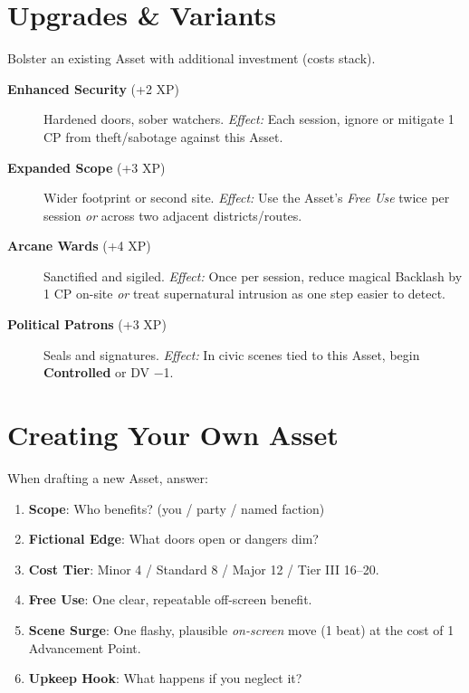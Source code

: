 \section{Upgrades \& Variants}
Bolster an existing Asset with additional investment (costs stack).
\begin{description}
  \item[\textbf{Enhanced Security} (+2 XP)]  Hardened doors, sober watchers. \emph{Effect:} Each session, ignore or mitigate 1 CP from theft/sabotage against this Asset.
  \item[\textbf{Expanded Scope} (+3 XP)]  Wider footprint or second site. \emph{Effect:} Use the Asset’s \emph{Free Use} twice per session \emph{or} across two adjacent districts/routes.
  \item[\textbf{Arcane Wards} (+4 XP)]  Sanctified and sigiled. \emph{Effect:} Once per session, reduce magical Backlash by 1 CP on-site \emph{or} treat supernatural intrusion as one step easier to detect.
  \item[\textbf{Political Patrons} (+3 XP)]  Seals and signatures. \emph{Effect:} In civic scenes tied to this Asset, begin \textbf{Controlled} or DV −1.
\end{description}

\section{Creating Your Own Asset}
When drafting a new Asset, answer:
\begin{enumerate}
  \item \textbf{Scope}: Who benefits? (you / party / named faction)
  \item \textbf{Fictional Edge}: What doors open or dangers dim?
  \item \textbf{Cost Tier}: Minor 4 / Standard 8 / Major 12 / Tier III 16–20.
  \item \textbf{Free Use}: One clear, repeatable off-screen benefit.
  \item \textbf{Scene Surge}: One flashy, plausible \emph{on-screen} move (1 beat) at the cost of 1 Advancement Point.
  \item \textbf{Upkeep Hook}: What happens if you neglect it?
\end{enumerate}

